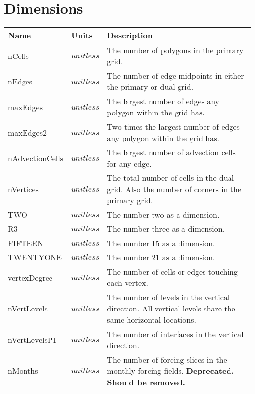 \chapter{Dimensions}
\label{chap:dimensions}
{\small
\begin{center}
\begin{longtable}{| p{1.0in} || p{1.0in} | p{4.0in} |}
	\hline 
	{\bf Name} & {\bf Units} & {\bf Description} \\
	\hline 
	\hline 
	nCells & $unitless$ & The number of polygons in the primary grid. \\ 
	\hline
	nEdges & $unitless$ & The number of edge midpoints in either the primary or dual grid. \\ 
	\hline
	maxEdges & $unitless$ & The largest number of edges any polygon within the grid has. \\ 
	\hline
	maxEdges2 & $unitless$ & Two times the largest number of edges any polygon within the grid has. \\ 
	\hline
	nAdvectionCells & $unitless$ & The largest number of advection cells for any edge. \\ 
	\hline
	nVertices & $unitless$ & The total number of cells in the dual grid. Also the number of corners in the primary grid. \\ 
	\hline
	TWO & $unitless$ & The number two as a dimension. \\ 
	\hline
	R3 & $unitless$ & The number three as a dimension. \\ 
	\hline
	FIFTEEN & $unitless$ & The number 15 as a dimension. \\ 
	\hline
	TWENTYONE & $unitless$ & The number 21 as a dimension. \\ 
	\hline
	vertexDegree & $unitless$ & The number of cells or edges touching each vertex. \\ 
	\hline
	nVertLevels & $unitless$ & The number of levels in the vertical direction. All vertical levels share the same horizontal locations. \\ 
	\hline
	nVertLevelsP1 & $unitless$ & The number of interfaces in the vertical direction. \\ 
	\hline
	nMonths & $unitless$ & The number of forcing slices in the monthly forcing fields. {\bf \color{red} Deprecated. Should be removed.} \\ 
	\hline
\end{longtable}
\end{center}
}
